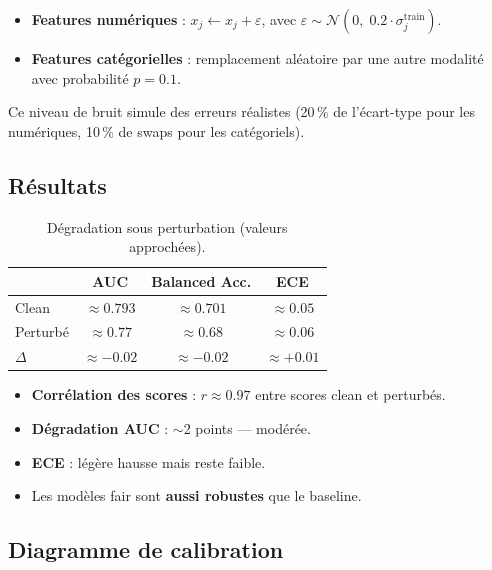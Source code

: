 \documentclass[11pt, a4paper]{article}
\begin{document}
\begin{itemize}
    \item \textbf{Features num\'{e}riques} : $x_j \leftarrow x_j + \varepsilon$, avec $\varepsilon \sim \mathcal{N}(0,\; 0.2 \cdot \sigma_j^{\text{train}})$.
    \item \textbf{Features cat\'{e}gorielles} : remplacement al\'{e}atoire par une autre modalit\'{e} avec probabilit\'{e} $p = 0.1$.
\end{itemize}

Ce niveau de bruit simule des erreurs r\'{e}alistes (20\,\% de l'\'{e}cart-type pour les num\'{e}riques, 10\,\% de swaps pour les cat\'{e}goriels).

\subsection{R\'{e}sultats}

\begin{table}[H]
\centering
\begin{tabular}{lccc}
\toprule
& \textbf{AUC} & \textbf{Balanced Acc.} & \textbf{ECE} \\
\midrule
Clean & $\approx 0.793$ & $\approx 0.701$ & $\approx 0.05$ \\
Perturb\'{e} & $\approx 0.77$ & $\approx 0.68$ & $\approx 0.06$ \\
$\Delta$ & $\approx -0.02$ & $\approx -0.02$ & $\approx +0.01$ \\
\bottomrule
\end{tabular}
\caption{D\'{e}gradation sous perturbation (valeurs approch\'{e}es).}
\end{table}

\begin{itemize}
    \item \textbf{Corr\'{e}lation des scores} : $r \approx 0.97$ entre scores clean et perturb\'{e}s.
    \item \textbf{D\'{e}gradation AUC} : $\sim$2 points --- mod\'{e}r\'{e}e.
    \item \textbf{ECE} : l\'{e}g\`{e}re hausse mais reste faible.
    \item Les mod\`{e}les fair sont \textbf{aussi robustes} que le baseline.
\end{itemize}

\subsection{Diagramme de calibration}
\end{document}
